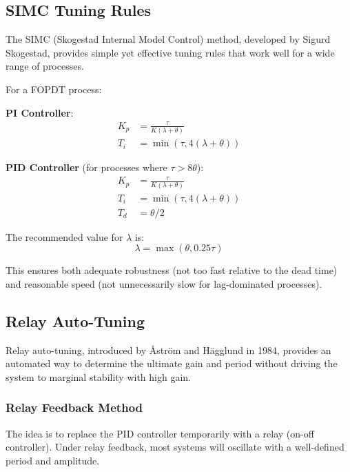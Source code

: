 \subsection{SIMC Tuning Rules}
\label{subsec:simc_tuning}

The SIMC (Skogestad Internal Model Control) method, developed by Sigurd Skogestad, provides simple yet effective tuning rules that work well for a wide range of processes.

For a FOPDT process:

\textbf{PI Controller}:
\begin{align}
K_p &= \frac{\tau}{K(\lambda + \theta)} \\
T_i &= \min(\tau, 4(\lambda + \theta))
\end{align}

\textbf{PID Controller} (for processes where $\tau > 8\theta$):
\begin{align}
K_p &= \frac{\tau}{K(\lambda + \theta)} \\
T_i &= \min(\tau, 4(\lambda + \theta)) \\
T_d &= \theta/2
\end{align}

The recommended value for $\lambda$ is:
\begin{equation}
\lambda = \max(\theta, 0.25\tau)
\end{equation}

This ensures both adequate robustness (not too fast relative to the dead time) and reasonable speed (not unnecessarily slow for lag-dominated processes).

\subsection{Relay Auto-Tuning}
\label{subsec:relay_autotuning}

Relay auto-tuning, introduced by \r{A}str\"{o}m and H\"{a}gglund in 1984, provides an automated way to determine the ultimate gain and period without driving the system to marginal stability with high gain.

\subsubsection{Relay Feedback Method}

The idea is to replace the PID controller temporarily with a relay (on-off controller). Under relay feedback, most systems will oscillate with a well-defined period and amplitude.

